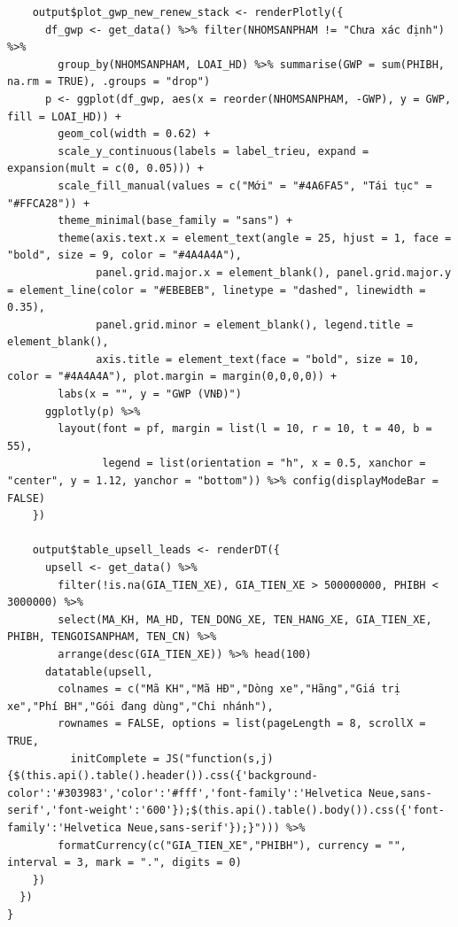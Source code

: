 \documentclass[12pt, a4paper]{article}
\begin{document}
\begin{lstlisting}
    output$plot_gwp_new_renew_stack <- renderPlotly({
      df_gwp <- get_data() %>% filter(NHOMSANPHAM != "Chưa xác định") %>%
        group_by(NHOMSANPHAM, LOAI_HD) %>% summarise(GWP = sum(PHIBH, na.rm = TRUE), .groups = "drop")
      p <- ggplot(df_gwp, aes(x = reorder(NHOMSANPHAM, -GWP), y = GWP, fill = LOAI_HD)) +
        geom_col(width = 0.62) +
        scale_y_continuous(labels = label_trieu, expand = expansion(mult = c(0, 0.05))) +
        scale_fill_manual(values = c("Mới" = "#4A6FA5", "Tái tục" = "#FFCA28")) +
        theme_minimal(base_family = "sans") +
        theme(axis.text.x = element_text(angle = 25, hjust = 1, face = "bold", size = 9, color = "#4A4A4A"),
              panel.grid.major.x = element_blank(), panel.grid.major.y = element_line(color = "#EBEBEB", linetype = "dashed", linewidth = 0.35),
              panel.grid.minor = element_blank(), legend.title = element_blank(),
              axis.title = element_text(face = "bold", size = 10, color = "#4A4A4A"), plot.margin = margin(0,0,0,0)) +
        labs(x = "", y = "GWP (VNĐ)")
      ggplotly(p) %>%
        layout(font = pf, margin = list(l = 10, r = 10, t = 40, b = 55),
               legend = list(orientation = "h", x = 0.5, xanchor = "center", y = 1.12, yanchor = "bottom")) %>% config(displayModeBar = FALSE)
    })

    output$table_upsell_leads <- renderDT({
      upsell <- get_data() %>%
        filter(!is.na(GIA_TIEN_XE), GIA_TIEN_XE > 500000000, PHIBH < 3000000) %>%
        select(MA_KH, MA_HD, TEN_DONG_XE, TEN_HANG_XE, GIA_TIEN_XE, PHIBH, TENGOISANPHAM, TEN_CN) %>%
        arrange(desc(GIA_TIEN_XE)) %>% head(100)
      datatable(upsell,
        colnames = c("Mã KH","Mã HĐ","Dòng xe","Hãng","Giá trị xe","Phí BH","Gói đang dùng","Chi nhánh"),
        rownames = FALSE, options = list(pageLength = 8, scrollX = TRUE,
          initComplete = JS("function(s,j){$(this.api().table().header()).css({'background-color':'#303983','color':'#fff','font-family':'Helvetica Neue,sans-serif','font-weight':'600'});$(this.api().table().body()).css({'font-family':'Helvetica Neue,sans-serif'});}"))) %>%
        formatCurrency(c("GIA_TIEN_XE","PHIBH"), currency = "", interval = 3, mark = ".", digits = 0)
    })
  })
}
\end{lstlisting}
\newpage
\end{document}
